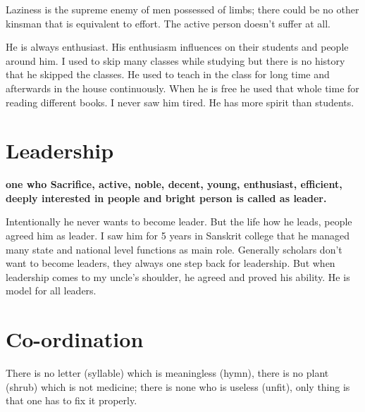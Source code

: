 \begin{verse}
\end{verse} 
Laziness is the supreme enemy of men possessed of limbs; there could be no other kinsman that is equivalent to effort. The active person doesn’t suffer at all.
 
He is always enthusiast. His enthusiasm influences on their students and people around him. I used to skip many classes while studying but there is no history that he skipped the classes. He used to teach in the class for long time and afterwards in the house continuously. When he is free he used that whole time for reading different books. I never saw him tired. He has more spirit than students.
 
\section{Leadership {\normalsize{}}}

\begin{verse}
\end{verse}
\textbf{one who Sacrifice, active, noble, decent, young, enthusiast, efficient, deeply interested in people and bright person is called as leader.}

Intentionally he never wants to become leader. But the life how he leads, people agreed him as leader. I saw him for 5 years in Sanskrit college that he managed many state and national level functions as main role. Generally scholars don’t want to become leaders, they always one step back for leadership. But when leadership comes to my uncle’s shoulder, he agreed and proved his ability. He is model for all leaders.
 
\section{Co-ordination {\normalsize{}}}

\begin{verse}
\end{verse} 
There is no letter (syllable) which is meaningless (hymn), there is no plant (shrub) which is not medicine; there is none who is useless (unfit), only thing is that one has to fix it properly.
 
